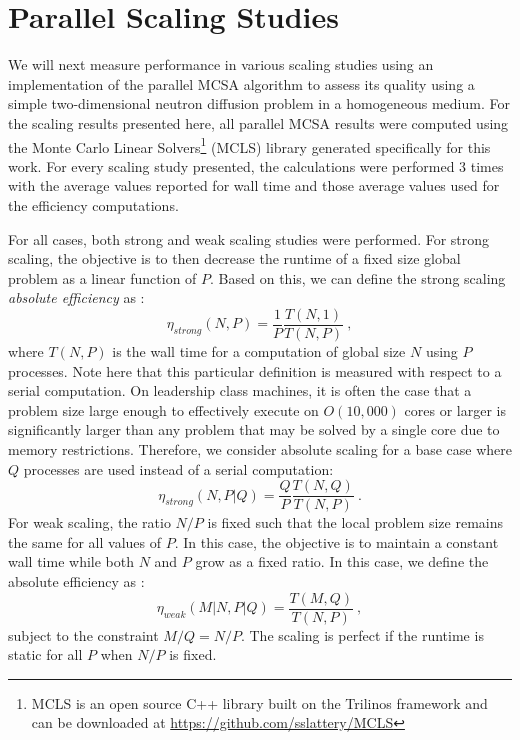 \documentclass{snamc2013}
\begin{document}
\section{Parallel Scaling Studies}
We will next measure performance in various scaling studies using an
implementation of the parallel MCSA algorithm to assess its quality
using a simple two-dimensional neutron diffusion problem in a
homogeneous medium. For the scaling results presented here, all
parallel MCSA results were computed using the Monte Carlo Linear
Solvers\footnote{MCLS is an open source C++ library built on the
  Trilinos\cite{heroux_overview_2005} framework and can be downloaded
  at \url{https://github.com/sslattery/MCLS}} (MCLS) library generated
specifically for this work. For every scaling study presented, the
calculations were performed 3 times with the average values reported
for wall time and those average values used for the efficiency
computations. 

For all cases, both strong and weak scaling studies were
performed. For strong scaling, the objective is to then decrease the
runtime of a fixed size global problem as a linear function of
$P$. Based on this, we can define the strong scaling \textit{absolute
  efficiency} as \cite{keyes_how_1999}:
\begin{equation}
  \eta_{strong}(N,P) = \frac{1}{P} \frac{T(N,1)}{T(N,P)}\:,
  \label{eq:strong_scaling_absolute}
\end{equation}
where $T(N,P)$ is the wall time for a computation of global size $N$
using $P$ processes. Note here that this particular definition is
measured with respect to a serial computation. On leadership class
machines, it is often the case that a problem size large enough to
effectively execute on $O(10,000)$ cores or larger is significantly
larger than any problem that may be solved by a single core due to
memory restrictions. Therefore, we consider absolute scaling for a
base case where $Q$ processes are used instead of a serial
computation:
\begin{equation}
  \eta_{strong}(N,P|Q) = \frac{Q}{P} \frac{T(N,Q)}{T(N,P)}\:.
  \label{eq:strong_scaling_absolute_ref}
\end{equation}
For weak scaling, the ratio $N/P$ is fixed such that the local problem
size remains the same for all values of $P$. In this case, the
objective is to maintain a constant wall time while both $N$ and $P$
grow as a fixed ratio. In this case, we define the absolute efficiency
as \cite{keyes_how_1999}:
\begin{equation}
  \eta_{weak}(M|N,P|Q) = \frac{T(M,Q)}{T(N,P)}\:,
  \label{eq:weak_scaling_absolute}
\end{equation}
subject to the constraint $M/Q = N/P$. The scaling is perfect if the
runtime is static for all $P$ when $N/P$ is fixed.  
\end{document}
